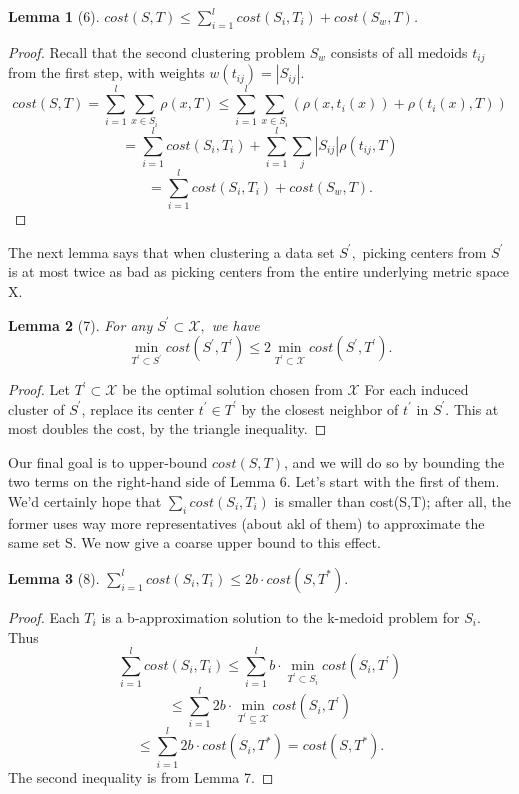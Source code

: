 \documentclass[letterpaper,10pt]{article}
\theoremstyle{plain}
\newtheorem{lemma}{Lemma}
\begin{document}
\begin{lemma}[6]
$cost(S,T)\le\sum_{i=1}^{l}cost(S_{i},T_{i})+cost(S_{w},T)$. 
\end{lemma}
\begin{proof}
Recall that the second clustering problem $S_{w}$ consists of all medoids $t_{ij}$ from the first step, with weights $w(t_{ij})=|S_{ij}|$. 
\[
cost(S,T)=\sum_{i=1}^{l}\sum_{x\in S_{i}}\rho(x,T)\le\sum_{i=1}^{l}\sum_{x\in S_{i}}(\rho(x,t_{i}(x))+\rho(t_{i}(x),T))
\]
\[
=\sum_{i=1}^{l}cost(S_{i},T_{i})+\sum_{i=1}^{l}\sum_{j}|S_{ij}|\rho(t_{ij},T)
\]
\[
=\sum_{i=1}^{l}cost(S_{i},T_{i})+cost(S_{w},T).
\]
\end{proof}

The next lemma says that when clustering a data set $S^{\prime},$ picking centers from $S^{\prime}$ is at most twice as bad as picking centers from the entire underlying metric space X. 

\begin{lemma}[7]
For any $S^{\prime}\subset\mathcal{X},$ we have 
\[
\min_{T^{\prime}\subset S^{\prime}}cost(S^{\prime},T^{\prime})\le2\min_{T^{\prime}\subset\mathcal{X}}cost(S^{\prime},T^{\prime}).
\]
\end{lemma}
\begin{proof}
Let $T^{\prime}\subset\mathcal{X}$ be the optimal solution chosen from $\mathcal{X}$ For each induced cluster of $S^{\prime}$, replace its center $t^{\prime}\in T^{\prime}$ by the closest neighbor of $t^{\prime}$ in $S^{\prime}$.  This at most doubles the cost, by the triangle inequality. 
\end{proof}

Our final goal is to upper-bound $cost(S,T)$, and we will do so by bounding the two terms on the right-hand side of Lemma 6.  Let's start with the first of them.  We'd certainly hope that $\sum_{i}cost(S_{i},T_{i})$ is smaller than cost(S,T); after all, the former uses way more representatives (about akl of them) to approximate the same set S.  We now give a coarse upper bound to this effect. 

\begin{lemma}[8]
$\sum_{i=1}^{l}cost(S_{i},T_{i})\le2b\cdot cost(S,T^{*}).$ 
\end{lemma}
\begin{proof}
Each $T_{i}$ is a b-approximation solution to the k-medoid problem for $S_{i}$.  Thus 
\[
\sum_{i=1}^{l}cost(S_{i},T_{i})\le\sum_{i=1}^{l}b\cdot \min_{T^{\prime}\subset S_{i}}cost(S_{i},T^{\prime})
\]
\[
\le\sum_{i=1}^{l}2b\cdot \min_{T^{\prime}\subseteq \mathcal{X}}cost(S_{i},T^{\prime})
\]
\[
\le\sum_{i=1}^{l}2b\cdot cost(S_{i},T^{*})=cost(S,T^{*}).
\]
The second inequality is from Lemma 7. 
\end{proof}
\end{document}
